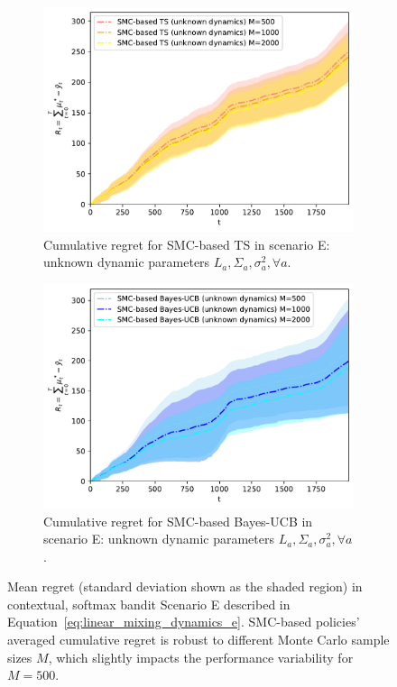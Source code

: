 \begin{figure}[!h]
\begin{subfigure}[b]{0.45\textwidth}
\includegraphics[width=\textwidth]{./fods_figs/dynamic/softmax/e_selectedM_cumulative_regret_dunknown_ts}
\caption{Cumulative regret for SMC-based TS in scenario E: unknown dynamic parameters $L_a,\Sigma_a,\sigma_a^2, \forall a$.}
\label{fig:dynamic_bandits_softmax_e_ts_dunknown_M}
\end{subfigure}\qquad
\begin{subfigure}[b]{0.45\textwidth}
\includegraphics[width=\textwidth]{./fods_figs/dynamic/softmax/e_selectedM_cumulative_regret_dunknown_bucb}
\caption{Cumulative regret for SMC-based Bayes-UCB in scenario E: unknown dynamic parameters $L_a,\Sigma_a,\sigma_a^2, \forall a$.}
\label{fig:dynamic_bandits_softmax_e_bucb_dunknown_M}
\end{subfigure}

\caption{
Mean regret (standard deviation shown as the shaded region) in contextual, softmax bandit Scenario E
described in Equation~\eqref{eq:linear_mixing_dynamics_e}.
SMC-based policies' averaged cumulative regret is robust to different Monte Carlo sample sizes $M$,
which slightly impacts the performance variability for $M=500$.
}
\label{fig:dynamic_bandits_softmax_e_M}
\end{figure}

